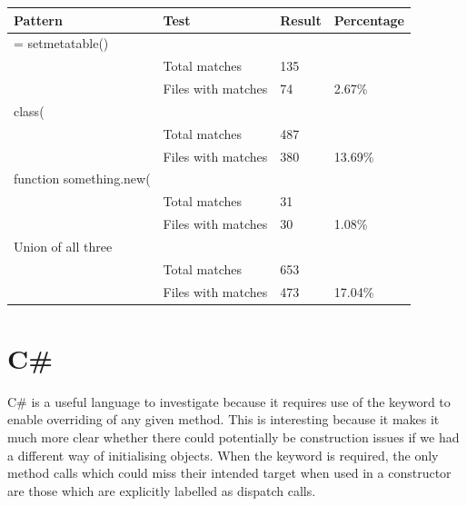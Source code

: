 \begin{center}
	\label{LuaResults}
	\begin{tabular}{|l|l|l|l|}
		\hline
		Pattern                 & Test               & Result & Percentage \\ \hline
		= setmetatable()        &                    &        &            \\ \hline
		& Total matches      & 135    &            \\ \hline
		& Files with matches & 74     & 2.67\%     \\ \hline
		class(                  &                    &        &            \\ \hline
		& Total matches      & 487    &            \\ \hline
		& Files with matches & 380    & 13.69\%    \\ \hline
		function something.new( &                    &        &            \\ \hline
		& Total matches      & 31     &            \\ \hline
		& Files with matches & 30     & 1.08\%     \\ \hline
		Union of all three      &                    &        &            \\ \hline
		& Total matches      & 653    &            \\ \hline
		& Files with matches & 473    & 17.04\%    \\ \hline
	\end{tabular}
\end{center}{

\section{C\#}
C\# is a useful language to investigate because it requires use of the  keyword to enable overriding of any given method. This is interesting because it makes it much more clear whether there could potentially be construction issues if we had a different way of initialising objects. When the  keyword is required, the only method calls which could miss their intended target when used in a constructor are those which are explicitly labelled as  dispatch calls.

}
